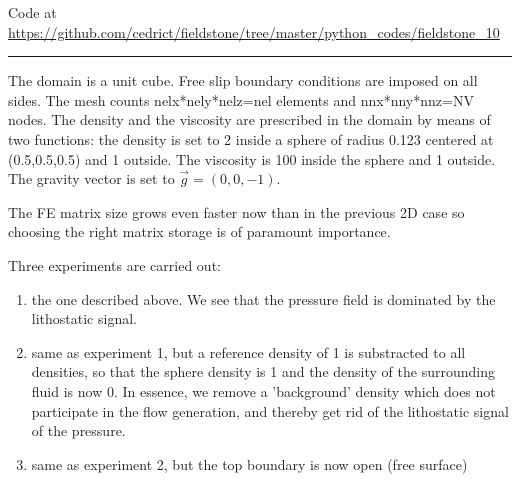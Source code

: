 

\begin{center}
Code at \url{https://github.com/cedrict/fieldstone/tree/master/python_codes/fieldstone_10}
\end{center}

\par\noindent\rule{\textwidth}{0.4pt}

The domain is a unit cube. Free slip boundary conditions 
are imposed on all sides. The mesh counts 
nelx*nely*nelz=nel elements and 
nnx*nny*nnz=NV nodes.
The density and the viscosity are prescribed in the domain 
by means of two functions:
the density is set to 2 inside a sphere of radius 0.123 centered 
at (0.5,0.5,0.5) and 1 outside. The viscosity is 100 inside the sphere
and 1 outside.  The gravity vector is set to $\vec{g}=(0,0,-1)$.

The FE matrix size grows even faster now than in the previous 2D case so
choosing the right matrix storage is of paramount importance. 

Three experiments are carried out:
\begin{enumerate}
\item the one described above.
We see that the pressure field is dominated by the lithostatic signal.
\item same as experiment 1, but a reference density of 1 is substracted to all densities, so that 
the sphere density is 1 and the density of the surrounding fluid is now 0. In essence, we remove a
'background' density which does not participate in the flow generation, and thereby get rid of the 
lithostatic signal of the pressure.
\item same as experiment 2, but the top boundary is now open (free surface)
\end{enumerate} 


